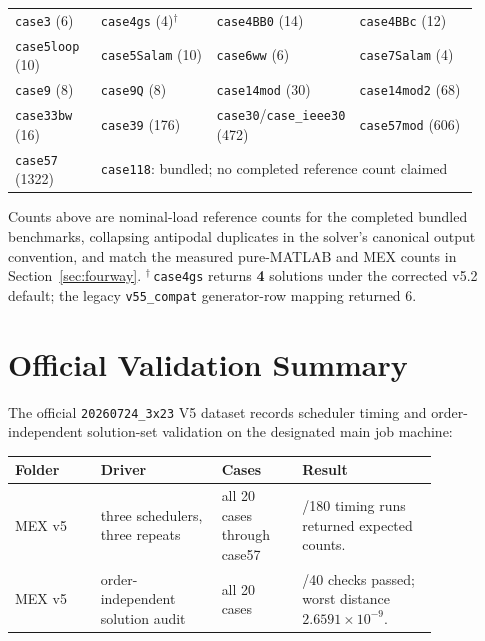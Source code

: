 \documentclass[11pt,a4paper]{article}
\newcommand{\code}[1]{\texttt{#1}}
\begin{document}
\begin{center}\small
\begin{tabular}{@{}p{0.19\linewidth}p{0.27\linewidth}p{0.18\linewidth}p{0.28\linewidth}@{}}
\toprule
\code{case3} (6) & \code{case4gs} (4)$^\dagger$ & \code{case4BB0} (14) & \code{case4BBc} (12)\\
\code{case5loop} (10) & \code{case5Salam} (10) & \code{case6ww} (6) & \code{case7Salam} (4)\\
\code{case9} (8) & \code{case9Q} (8) & \code{case14mod} (30) & \code{case14mod2} (68)\\
\code{case33bw} (16) & \code{case39} (176) & \code{case30}/\code{case_ieee30} (472) & \code{case57mod} (606)\\
\code{case57} (1322) & \multicolumn{3}{l}{\code{case118}: bundled; no completed reference count claimed}\\
\bottomrule
\end{tabular}
\end{center}

Counts above are nominal-load reference counts for the completed bundled benchmarks,
collapsing antipodal duplicates in the solver's canonical output convention, and match the
measured pure-MATLAB and MEX counts in Section~\ref{sec:fourway}. $^\dagger$\,\code{case4gs} returns
\textbf{4} solutions under the corrected v5.2 default; the legacy \code{v55_compat}
generator-row mapping returned 6.

\section{Official Validation Summary}

The official \code{20260724_3x23} V5 dataset records scheduler timing and
order-independent solution-set validation on the designated main job machine:

\begin{center}
\small
\setlength{\tabcolsep}{3pt}
\begin{tabular}{@{}>{\raggedright\arraybackslash}p{0.17\linewidth}
>{\raggedright\arraybackslash}p{0.24\linewidth}
>{\raggedright\arraybackslash}p{0.16\linewidth}
>{\raggedright\arraybackslash}p{0.27\linewidth}@{}}
\toprule
\textbf{Folder} & \textbf{Driver} & \textbf{Cases} & \textbf{Result}\\
\midrule
MEX v5 & three schedulers, three repeats & all 20 cases through case57 &
180/180 timing runs returned expected counts.\\
MEX v5 & order-independent solution audit & all 20 cases &
40/40 checks passed; worst distance $2.6591\times10^{-9}$.\\
\bottomrule
\end{tabular}
\end{center}
\end{document}
